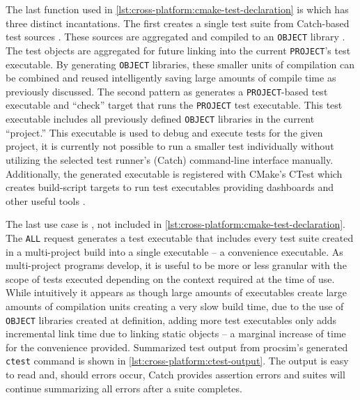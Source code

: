 The last function used in \cref{lst:cross-platform:cmake-test-declaration} is  which has three distinct incantations. The first creates a single test suite from Catch-based test sources \cite{CatchLib}. These sources are aggregated and compiled to an \texttt{OBJECT} library \cite{CMake:add_library}. The test objects are aggregated for future linking into the current \texttt{PROJECT}'s test executable. By generating \texttt{OBJECT} libraries, these smaller units of compilation can be combined and reused intelligently saving large amounts of compile time as previously discussed. The second pattern as  generates a \texttt{PROJECT}-based test executable and ``check'' target that runs the \texttt{PROJECT} test executable. This test executable includes all previously defined \texttt{OBJECT} libraries in the current ``project.'' This executable is used to debug and execute tests for the given project, it is currently not possible to run a smaller test individually without utilizing the selected test runner's (Catch) command-line interface manually. Additionally, the generated executable is registered with CMake's CTest which creates build-script targets to run test executables providing dashboards and other useful tools \cite{CMake:CTest}. 

The last use case is , not included in \cref{lst:cross-platform:cmake-test-declaration}. The \texttt{ALL} request generates a test executable that includes every test suite created in a multi-project build into a single executable -- a convenience executable. As multi-project programs develop, it is useful to be more or less granular with the scope of tests executed depending on the context required at the time of use. While intuitively it appears as though large amounts of executables create large amounts of compilation units creating a very slow build time, due to the use of \texttt{OBJECT} libraries created at definition, adding more test executables only adds incremental link time due to linking static objects -- a marginal increase of time for the convenience provided. Summarized test output from procsim's generated \texttt{ctest} command is shown in \cref{lst:cross-platform:ctest-output}. The output is easy to read and, should errors occur, Catch provides assertion errors and suites will continue summarizing all errors after a suite completes.

